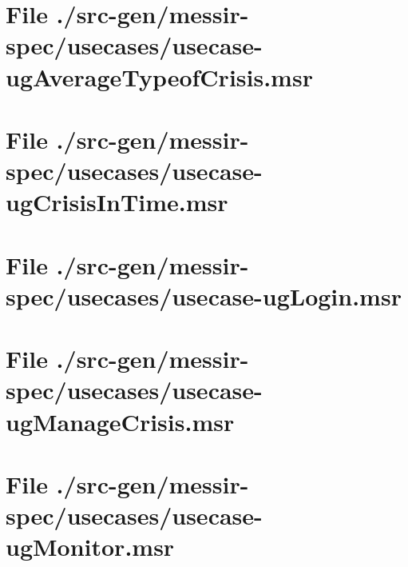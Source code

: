 \section[File /src-gen/messir-spec/usecases/usecase-ugAverageTypeofCrisis.msr]{File ./src-gen/messir-spec/usecases/usecase-ugAverageTypeofCrisis.msr}
\scriptsize

\normalsize
	
\section[File /src-gen/messir-spec/usecases/usecase-ugCrisisInTime.msr]{File ./src-gen/messir-spec/usecases/usecase-ugCrisisInTime.msr}
\scriptsize

\normalsize
	
\section[File /src-gen/messir-spec/usecases/usecase-ugLogin.msr]{File ./src-gen/messir-spec/usecases/usecase-ugLogin.msr}
\scriptsize

\normalsize
	
\section[File /src-gen/messir-spec/usecases/usecase-ugManageCrisis.msr]{File ./src-gen/messir-spec/usecases/usecase-ugManageCrisis.msr}
\scriptsize

\normalsize
	
\section[File /src-gen/messir-spec/usecases/usecase-ugMonitor.msr]{File ./src-gen/messir-spec/usecases/usecase-ugMonitor.msr}
\scriptsize

\normalsize
	
